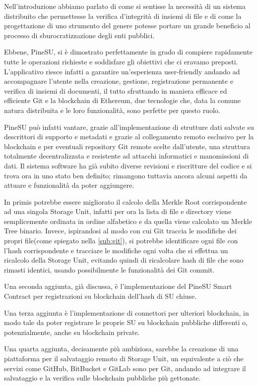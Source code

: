 \label{cap:sf}
Nell'introduzione abbiamo parlato di come si sentisse la necessità
di un sistema distribuito che permettesse la verifica d'integrità
di insiemi di file e di come la progettazione di uno strumento del
genere potesse portare un grande beneficio al processo di
sburocratizzazione degli enti pubblici.

Ebbene, PineSU, si è dimostrato perfettamente in grado di
compiere rapidamente tutte le operazioni richieste e soddisfare gli
obiettivi che ci eravamo preposti.
L'applicativo riesce infatti a garantire un'esperienza user-friendly andando ad 
accompagnare l'utente nella 
creazione, gestione, registrazione permanente e verifica di insiemi di documenti,
il tutto sfruttando in maniera efficace ed efficiente Git e la blockchain di Ethereum,
due tecnologie che, data la comune natura distribuita e le loro funzionalità,
sono perfette per questo ruolo.

PineSU può infatti vantare, grazie all'implementazione di strutture dati salvate
su descrittori di supporto e metadati e grazie al collegamento remoto esclusivo per la blockchain
e per eventuali repository Git remote scelte dall'utente, una struttura totalmente
decentralizzata e resistente ad attacchi informatici e manomissioni di dati.
Il sistema software ha già subito diverse revisioni e riscritture del codice e si trova ora in uno
stato ben definito; rimangono tuttavia ancora alcuni aspetti da attuare e funzionalità da poter aggiungere.

In primis potrebbe essere migliorato il calcolo della Merkle Root corrispondente
ad una singola Storage Unit, infatti per ora la lista di file e directory viene
semplicemente ordinata in ordine alfabetico e da quella viene calcolato
un Merkle Tree binario. Invece, ispirandosi al modo con cui Git traccia le modifiche
dei propri file(come spiegato nella \autoref{sub:git}),
si potrebbe identificare ogni file con l'hash corrispondente e tracciare le modifiche ogni
volta che si effettua un ricalcolo della Storage Unit, evitando quindi di ricalcolare hash
di file che sono rimasti identici, usando possibilmente le funzionalità dei Git commit.

Una seconda aggiunta, già discussa, è l'implementazione del PineSU Smart Contract
per registrazioni su blockchain dell'hash di SU chiuse.

Una terza aggiunta è l'implementazione di connettori per ulteriori blockchain, in modo tale
da poter registrare le proprie SU su blockchain pubbliche differenti o, potenzialmente,
anche su blockchain private.

\thispagestyle{mystyle}
Una quarta aggiunta, decisamente più ambiziosa, sarebbe la creazione di una piattaforma
per il salvataggio remoto di Storage Unit, un equivalente a ciò che servizi come GitHub,
BitBucket e GitLab sono per Git, andando ad integrare il salvataggio e la verifica sulle
blockchain pubbliche più gettonate.